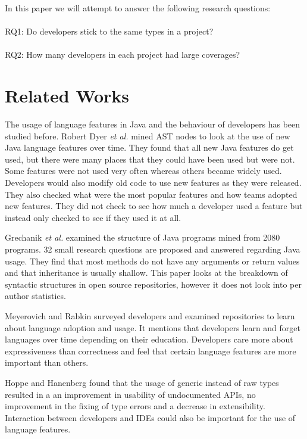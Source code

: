 \documentclass{sig-alternate-05-2015}
\begin{document}
In this paper we will attempt to answer the following research questions: \\ \\
RQ1: Do developers stick to the same types in a project? \\ \\
RQ2: How many developers in each project had large coverages?


\section{Related Works}
The usage of language features in Java and the behaviour of developers has been studied before. 
Robert Dyer \textit{et al.} \cite{Dyer:2014:MBA:2568225.2568295} mined AST nodes to look at the use of new Java language features over time. They found that all new Java features do get used, but there were many places that they could have been used but were not. Some features were not used very often whereas others became widely used. Developers would also modify old code to use new features as they were released. They also checked what were the most popular features and how teams adopted new features. They did not check to see how much a developer used a feature but instead only checked to see if they used it at all.

Grechanik \textit{et al.} \cite{Grechanik:2010:EIL:1852786.1852801} examined the structure of Java programs mined from 2080 programs. 32 small research questions are proposed and answered regarding Java usage. They find that most methods do not have any arguments or return values and that inheritance is usually shallow. This paper looks at the breakdown of syntactic structures in open source repositories, however it does not look into per author statistics. 

Meyerovich and Rabkin \cite{Meyerovich:2013:EAP:2509136.2509515} surveyed developers and examined repositories to learn about language adoption and usage. It mentions that developers learn and forget languages over time depending on their education. Developers care more about expressiveness than correctness and feel that certain language features are more important than others.

Hoppe and Hanenberg \cite{Hoppe:2013:DBG:2544173.2509528} found that the usage of generic instead of raw types resulted in a an improvement in usability of undocumented APIs, no improvement in the fixing of type errors and a decrease in extensibility. Interaction between developers and IDEs could also be important for the use of language features.
\end{document}
